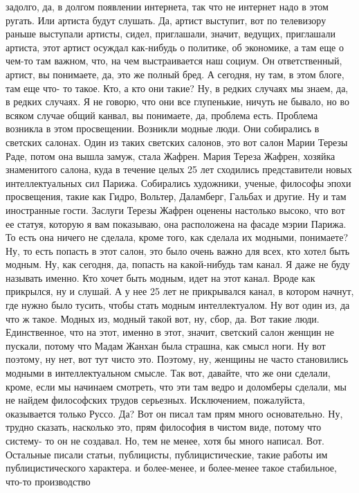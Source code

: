 задолго, да, в долгом появлении интернета, так что не интернет надо в этом
ругать. Или артиста будут слушать. Да, артист выступит, вот по телевизору раньше
выступали артисты, сидел, приглашали, значит, ведущих, приглашали артиста, этот
артист осуждал как-нибудь о политике, об экономике, а там еще о чем-то там
важном, что, на чем выстраивается наш социум. Он ответственный, артист, вы
понимаете, да, это же полный бред. А сегодня, ну там, в этом блоге, там еще что-
то такое. Кто, а кто они такие? Ну, в редких случаях мы знаем, да, в редких
случаях. Я не говорю, что они все глупенькие, ничуть не бывало, но во всяком
случае общий канвал, вы понимаете, да, проблема есть. Проблема возникла в этом
просвещении. Возникли модные люди. Они собирались в светских салонах. Один из
таких светских салонов, это вот салон Марии Терезы Раде, потом она вышла замуж,
стала Жафрен. Мария Тереза Жафрен, хозяйка знаменитого салона, куда в течение
целых 25 лет сходились представители новых интеллектуальных сил Парижа.
Собирались художники, ученые, философы эпохи просвещения, такие как Гидро,
Вольтер, Даламберг, Гальбах и другие. Ну и там иностранные гости. Заслуги Терезы
Жафрен оценены настолько высоко, что вот ее статуя, которую я вам показываю, она
расположена на фасаде мэрии Парижа. То есть она ничего не сделала, кроме того,
как сделала их модными, понимаете? Ну, то есть попасть в этот салон, это было
очень важно для всех, кто хотел быть модным. Ну, как сегодня, да, попасть на
какой-нибудь там канал. Я даже не буду называть именно. Кто хочет быть модным,
идет на этот канал. Вроде как прикрылся, ну и слушай. А у нее 25 лет не
прикрывался канал, в котором начнут, где нужно было тусить, чтобы стать модным
интеллектуалом. Ну вот один из, да что ж такое. Модных из, модный такой вот, ну,
сбор, да. Вот такие люди. Единственное, что на этот, именно в этот, значит,
светский салон женщин не пускали, потому что Мадам Жанхан была страшна, как
смысл ноги. Ну вот поэтому, ну нет, вот тут чисто это. Поэтому, ну, женщины не
часто становились модными в интеллектуальном смысле. Так вот, давайте, что же
они сделали, кроме, если мы начинаем смотреть, что эти там ведро и доломберы
сделали, мы не найдем философских трудов серьезных. Исключением, пожалуйста,
оказывается только Руссо. Да? Вот он писал там прям много основательно. Ну,
трудно сказать, насколько это, прям философия в чистом виде, потому что систему-
то он не создавал. Но, тем не менее, хотя бы много написал. Вот. Остальные
писали статьи, публицисты, публицистические, такие работы им публицистического
характера. и более-менее, и более-менее такое стабильное, что-то производство
